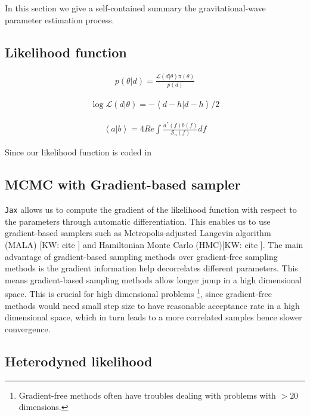 \documentclass[twocolumn]{aastex631}
\newcommand{\kw}[1]{{\color{rb4}[KW: #1 ]}}
\begin{document}
In this section we give a self-contained summary the gravitational-wave
parameter estimation process.

\subsection{Likelihood function}
\label{sec:likelihood}

\begin{align}
    p(\theta| d) = \frac{\mathcal{L}(d|\theta)\pi(\theta)}{p(d)}
\end{align}

\begin{align}
    \log{\mathcal{L}(d|\theta)} = -\left<d-h|d-h\right>/2
\end{align}

\begin{align}
    \left<a|b\right> = 4 Re\int \frac{a^*(f)b(f)}{\mathcal{S}_n(f)} df
\end{align}

Since our likelihood function is coded in 
\subsection{MCMC with Gradient-based sampler}
\label{sec:gradient}

\texttt{Jax} allows us to compute the gradient of the likelihood function with
respect to the parameters through automatic differentiation. This enables us to
use gradient-based samplers such as Metropolis-adjusted Langevin algorithm
(MALA) \kw{cite} and Hamiltonian Monte Carlo (HMC)\kw{cite}. The main advantage
of gradient-based sampling methods over gradient-free sampling methods is the
gradient information help decorrelates different parameters. This means
gradient-based sampling methods allow longer jump in a high dimensional space.
This is crucial for high dimensional problems \footnote{Gradient-free methods
often have troubles dealing with problems with $>20$ dimensions.}, since
gradient-free methods would need small step size to have reasonable acceptance
rate in a high dimensional space, which in turn leads to a more correlated
samples hence slower convergence.




\subsection{Heterodyned likelihood}
\end{document}
